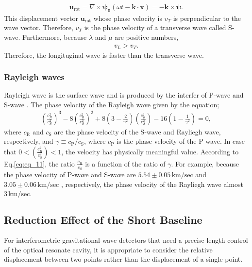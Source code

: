 \begin{eqnarray}
  \bm{u}_{\mathrm{rot}} = \nabla\times{\bm{\psi_{0}}(\omega{t}-\bm{k}\cdot{\bm{x}})} =-\bm{k}\times{\bm{\psi}}.
\end{eqnarray}
This displacement vector $\bm{u}_{\mathrm{rot}}$ whose phase velocity is $v_{T}$ is perpendicular to the wave vector. Therefore, $v_{T}$ is the phase velocity of a transverse wave called S-wave. Furthermore, because  $\lambda$ and $\mu$ are positive numbers, 
\begin{eqnarray}
  v_{L} > v_{T}.\label{eq:eq_10}
\end{eqnarray}
Therefore, the longituginal wave is faster than the transverse wave.



\subsubsection{Rayleigh waves}
Rayleigh wave is the surface wave and is produced by the interfer of P-wave and S-wave \cite{hasegawa2015jishin}. The phase velocity of the Rayleigh wave given by the equation;
\begin{eqnarray}\label{eq:eq_11}
\left(\frac{c_{R}^{2}}{c_{S}^{2}}\right)^{3}-8\left(\frac{c_{R}^{2}}{c_{S}^{2}}\right)^{2}+8\left(3-\frac{2}{\gamma^2}\right)\left(\frac{c_{R}^{2}}{c_{S}^{2}}\right)-16\left(1-\frac{1}{\gamma^2}\right)=0,
\end{eqnarray}
where $c_{\mathrm{R}}$ and $c_{\mathrm{S}}$ are the phase velocity of the S-wave and Rayliegh wave, respectively, and $\gamma\equiv c_{\mathrm{P}}/c_{\mathrm{S}}$, where $c_{\mathrm{P}}$ is the phase velocity of the P-wave. In case that $0 < (\frac{c_{R}^2}{c_{S}^2}) <1$, the velocity has physically meaningful value. According to Eq.\ref{eq:eq_11}, the ratio $\frac{c_R}{c_S}$ is a function of the ratio of $\gamma$. For example, because the phase velocity of P-wave and S-wave are $5.54\pm0.05\,\mathrm{km/sec}$ and $3.05\pm0.06\,\mathrm{km/sec}$ \cite{takemoto2003}, respectively, the phase velocity of the Rayliegh wave almost $3\,\mathrm{km/sec}$.


\subsection{Reduction Effect of the Short Baseline} \label{sec:313}
For interferometric gravitational-wave detectors that need a precise length control of the optical resonate cavity, it is appropriate to consider the relative displacement between two points rather than the displacement of a single point.



